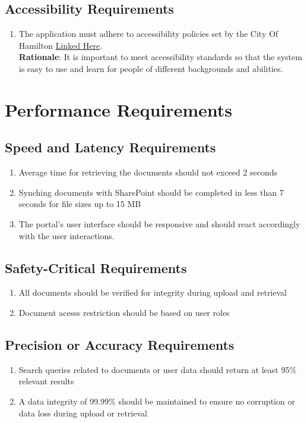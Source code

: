 \documentclass[12pt]{article}
\begin{document}
\subsection{Accessibility Requirements}
\begin{enumerate}[{UH-AS}1.]
  \item The application must adhere to accessibility policies set by the City Of
    Hamilton
    \href{https://www.hamilton.ca/people-programs/inclusion-diversity-equity-accessibility/accessibility-services/accessibility#policies-procedures}{Linked
    Here}.\\
    \textbf{Rationale}: It is important to meet accessibility standards so that
    the system is easy to use and learn for people of different backgrounds and
    abilities.
\end{enumerate}
\section{Performance Requirements}
\subsection{Speed and Latency Requirements}
\begin{enumerate}[{PR-SL}1.]
  \item Average time for retrieving the documents should not exceed 2 seconds
  \item Synching documents with SharePoint should be completed in
    less than 7 seconds for file sizes up to 15 MB
  \item The portal's user interface should be responsive and should
    react accordingly with the user interactions.
\end{enumerate}
\subsection{Safety-Critical Requirements}
\begin{enumerate}[{PR-SC}1.]
  \item All documents should be verified for integrity during upload
    and retrieval
  \item Document acesss restriction should be based on user roles
\end{enumerate}
\subsection{Precision or Accuracy Requirements}
\begin{enumerate}[{PR-PA}1.]
  \item Search queries related to documents or user data should
    return at least 95\% relevant results
  \item A data integrity of 99.99\% should be maintained to ensure no
    corruption or data loss during upload or retrieval
\end{enumerate}
\end{document}
